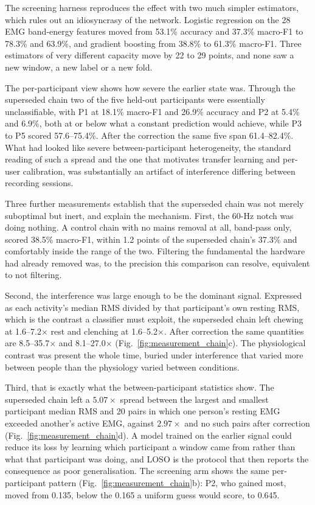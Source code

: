 \documentclass[pdflatex,sn-nature,iicol]{sn-jnl}
\begin{document}
The screening harness reproduces the effect with two much simpler estimators, which rules out an idiosyncrasy of the network. Logistic regression on the 28 EMG band-energy features moved from 53.1\% accuracy and 37.3\% macro-F1 to 78.3\% and 63.9\%, and gradient boosting from 38.8\% to 61.3\% macro-F1. Three estimators of very different capacity move by 22 to 29 points, and none saw a new window, a new label or a new fold.

The per-participant view shows how severe the earlier state was. Through the superseded chain two of the five held-out participants were essentially unclassifiable, with P1 at 18.1\% macro-F1 and 26.9\% accuracy and P2 at 5.4\% and 6.9\%, both at or below what a constant prediction would achieve, while P3 to P5 scored 57.6--75.4\%. After the correction the same five span 61.4--82.4\%. What had looked like severe between-participant heterogeneity, the standard reading of such a spread and the one that motivates transfer learning and per-user calibration, was substantially an artifact of interference differing between recording sessions.

Three further measurements establish that the superseded chain was not merely suboptimal but inert, and explain the mechanism. First, the 60-Hz notch was doing nothing. A control chain with no mains removal at all, band-pass only, scored 38.5\% macro-F1, within 1.2 points of the superseded chain's 37.3\% and comfortably inside the range of the two. Filtering the fundamental the hardware had already removed was, to the precision this comparison can resolve, equivalent to not filtering.

Second, the interference was large enough to be the dominant signal. Expressed as each activity's median RMS divided by that participant's own resting RMS, which is the contrast a classifier must exploit, the superseded chain left chewing at 1.6--7.2$\times$ rest and clenching at 1.6--5.2$\times$. After correction the same quantities are 8.5--35.7$\times$ and 8.1--27.0$\times$ (Fig.~\ref{fig:measurement_chain}c). The physiological contrast was present the whole time, buried under interference that varied more between people than the physiology varied between conditions.

Third, that is exactly what the between-participant statistics show. The superseded chain left a $5.07\times$ spread between the largest and smallest participant median RMS and 20 pairs in which one person's resting EMG exceeded another's active EMG, against $2.97\times$ and no such pairs after correction (Fig.~\ref{fig:measurement_chain}d). A model trained on the earlier signal could reduce its loss by learning which participant a window came from rather than what that participant was doing, and LOSO is the protocol that then reports the consequence as poor generalisation. The screening arm shows the same per-participant pattern (Fig.~\ref{fig:measurement_chain}b): P2, who gained most, moved from 0.135, below the 0.165 a uniform guess would score, to 0.645.
\end{document}
